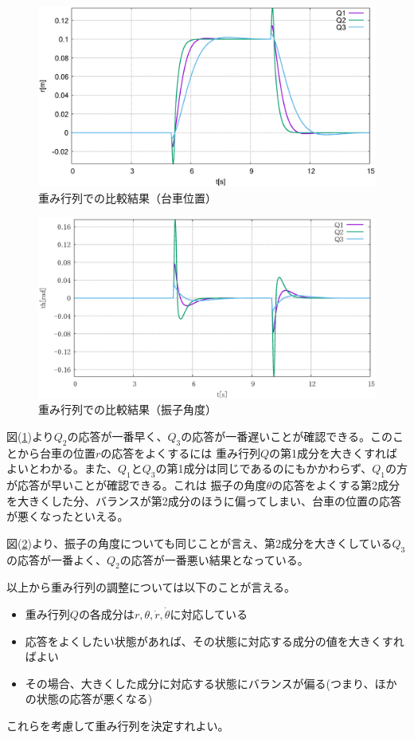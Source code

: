 	\begin{figure}[H]
		\centering
		\includegraphics[width=0.8\linewidth]{gazo/simulation_QRF_compare_R.eps}
		\caption{重み行列での比較結果（台車位置）}
		\label{image:simulation_QRF_r}
	\end{figure}
	\begin{figure}[H]
		\centering
		\includegraphics[width=0.8\linewidth]{gazo/simulation_QRF_compare_THETA.eps}
		\caption{重み行列での比較結果（振子角度）}
		\label{image:simulation_QRF_th}
	\end{figure}
	図(\ref{image:simulation_QRF_r})より$Q_2$の応答が一番早く、$Q_3$の応答が一番遅いことが確認できる。このことから台車の位置$r$の応答をよくするには
	重み行列$Q$の第1成分を大きくすればよいとわかる。また、$Q_1$と$Q_3$の第1成分は同じであるのにもかかわらず、$Q_1$の方が応答が早いことが確認できる。これは
	振子の角度$\theta$の応答をよくする第2成分を大きくした分、バランスが第2成分のほうに偏ってしまい、台車の位置の応答が悪くなったといえる。
	\par
	図(\ref{image:simulation_QRF_th})より、振子の角度についても同じことが言え、第2成分を大きくしている$Q_3$の応答が一番よく、$Q_2$の応答が一番悪い結果となっている。
	\par
	以上から重み行列の調整については以下のことが言える。
	\begin{itemize}
	  \item 重み行列$Q$の各成分は$r,\theta,\dot{r},\dot{\theta}$に対応している
	  \item 応答をよくしたい状態があれば、その状態に対応する成分の値を大きくすればよい
	  \item その場合、大きくした成分に対応する状態にバランスが偏る(つまり、ほかの状態の応答が悪くなる)
	\end{itemize}
	これらを考慮して重み行列を決定すれよい。
	
